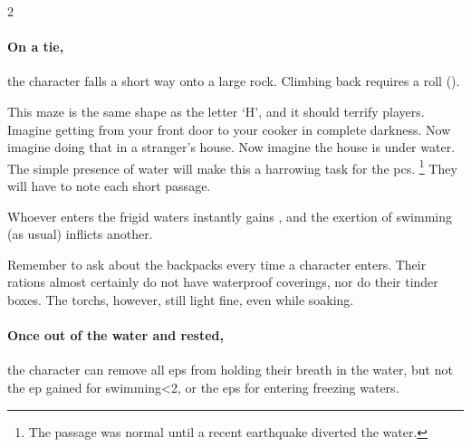 \begin{multicols}{2}
\playCommentaryTeamwork[t]

\paragraph{On a tie,}
the character falls a short way onto a large rock.
Climbing back requires a  roll (\tn[10]).

\bigbreak



This maze is the same shape as the letter `H', and it should terrify players.
Imagine getting from your front door to your cooker in complete darkness.
Now imagine doing that in a stranger's house.
Now imagine the house is under water.
The simple presence of water will make this a harrowing task for the \glspl{pc}.%
\footnote{The passage was normal until a recent earthquake diverted the water.}
They will have to note each short passage.

Whoever enters the frigid waters instantly gains , and the exertion of swimming (as usual) inflicts another.

Remember to ask about the backpacks every time a character enters.
Their \glspl{ration} almost certainly do not have waterproof coverings, nor do their tinder boxes.
The \glspl{torch}, however, still light fine, even while soaking.

\paragraph{Once out of the water and rested,}
the character can remove all \glspl{ep} from holding their breath in the water, but not the \gls{ep} gained for swimming\ifnum\value{temperature}<2\else, or the \glspl{ep} for entering freezing waters\fi.




\end{multicols}
